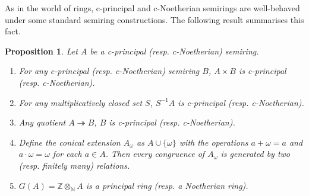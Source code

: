 \documentclass[notitlepage, 10pt]{article}
\theoremstyle{defin}
\theoremstyle{theo}
\newtheorem{prop}[defn]{Proposition}
\theoremstyle{rema}
\newcommand{\N}{\mathbb{N}}
\newcommand{\Z}{\mathbb{Z}}
\begin{document}
As in the world of rings, c-principal and c-Noetherian semirings are well-behaved under some standard semiring constructions. The following result summarises this fact.

\begin{prop}
    \label{p:quotprod}
    Let $A$ be a c-principal (resp. c-Noetherian) semiring.
    \begin{enumerate}
        \item For any c-principal (resp. c-Noetherian) semiring $B$, $A\times B$ is c-principal (resp. c-Noetherian).
        \item For any multiplicatively closed set $S$, $S^{-1}A$ is c-principal (resp. c-Noetherian).
        \item Any quotient $A \twoheadrightarrow B$, $B$ is c-principal (resp. c-Noetherian).
        \item Define the \textit{conical extension} $A_\omega$ as $A\cup \{\omega\}$ with the operations $a+\omega = a$ and $a\cdot \omega = \omega$ for each $a\in A$. Then every congruence of $A_\omega$ is generated by two (resp. finitely many) relations.
        \item $G(A) = \Z \otimes_\N A$ is a principal ring (resp. a Noetherian ring).
    \end{enumerate}
\end{prop}
\end{document}
